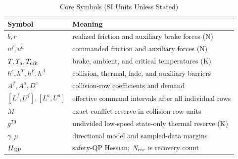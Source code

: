 \begin{table}[t]
\caption{Core Symbols (SI Units Unless Stated)}
\label{tab:nomenclature}
\centering\scriptsize
\begin{tabular}{@{}lp{}@{}}
\toprule
Symbol & Meaning \\
\midrule
$b,r$ & realized friction and auxiliary brake forces (N) \\
$u^f,u^a$ & commanded friction and auxiliary forces (N) \\
$T,T_a,T_{\rm crit}$ & brake, ambient, and critical temperatures (K) \\
$h^c,h^T,h^F,h^A$ & collision, thermal, fade, and auxiliary barriers \\
$A^f,A^a,D^c$ & collision-row coefficients and demand \\
$[L^f,U^f],[L^a,U^a]$ & effective command intervals after all individual rows \\
$M$ & exact conflict reserve in collision-row units \\
$g^{T0}$ & undivided low-speed state-only thermal reserve (K) \\
$\gamma,\mu$ & directional model and sampled-data margins \\
$H_{\rm QP}$ & safety-QP Hessian; $N_{\rm rec}$ is recovery count \\
\bottomrule
\end{tabular}
\end{table}
